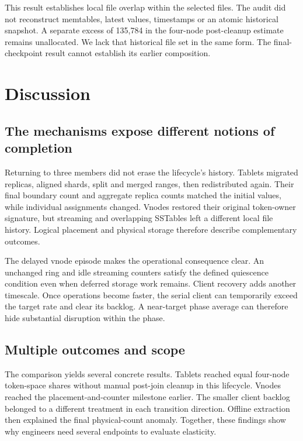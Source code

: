 This result establishes local file overlap within the selected files. The audit did not reconstruct memtables, latest values, timestamps or an atomic historical snapshot. A separate excess of 135,784 in the four-node post-cleanup estimate remains unallocated. We lack that historical file set in the same form. The final-checkpoint result cannot establish its earlier composition.

\newpage

\hypertarget{discussion}{%
\section{Discussion}\label{discussion}}

\hypertarget{the-mechanisms-expose-different-notions-of-completion}{%
\subsection{The mechanisms expose different notions of
completion}\label{the-mechanisms-expose-different-notions-of-completion}}

Returning to three members did not erase the lifecycle's history. Tablets migrated replicas, aligned shards, split and merged ranges, then redistributed again. Their final boundary count and aggregate replica counts matched the initial values, while individual assignments changed. Vnodes restored their original token-owner signature, but streaming and overlapping SSTables left a different local file history. Logical placement and physical storage therefore describe complementary outcomes.

The delayed vnode episode makes the operational consequence clear. An unchanged ring and idle streaming counters satisfy the defined quiescence condition even when deferred storage work remains. Client recovery adds another timescale. Once operations become faster, the serial client can temporarily exceed the target rate and clear its backlog. A near-target phase average can therefore hide substantial disruption within the phase.

\hypertarget{multiple-outcomes-and-scope}{%
\subsection{Multiple outcomes and
scope}\label{multiple-outcomes-and-scope}}

The comparison yields several concrete results. Tablets reached equal four-node token-space shares without manual post-join cleanup in this lifecycle. Vnodes reached the placement-and-counter milestone earlier. The smaller client backlog belonged to a different treatment in each transition direction. Offline extraction then explained the final physical-count anomaly. Together, these findings show why engineers need several endpoints to evaluate elasticity.

